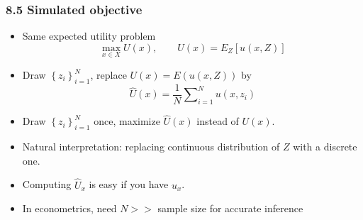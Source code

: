\documentclass[bigger,handout]{beamer}
\newenvironment{stepitemize}{\begin{itemize}[<+->]}{\end{itemize} }
\begin{document}
\begin{frame}%

\frametitle{8.5 Simulated objective}

\begin{stepitemize}
\item Same expected utility problem%
\begin{equation*}
\max_{x\in X}U(x),\qquad U(x)=E_{Z}[u(x,Z)]
\end{equation*}

\item Draw $\left\{ z_{i}\right\} _{i=1}^{N}$, replace $U(x)=E(u(x,Z))$ by 
\begin{equation*}
\hat{U}(x)=\frac{1}{N}\sum\nolimits_{i=1}^{N}u(x,z_{i})
\end{equation*}

\item Draw $\left\{ z_{i}\right\} _{i=1}^{N}$ once, maximize $\hat{U}(x)$
instead of $U(x)$.

\item Natural interpretation: replacing continuous distribution of $Z$ with
a discrete one.

\item Computing $\hat{U}_{x}$ is easy if you have $u_{x}$.
\item In econometrics, need $N>>$ sample size for accurate inference
\end{stepitemize}


\end{frame}%
\end{document}
